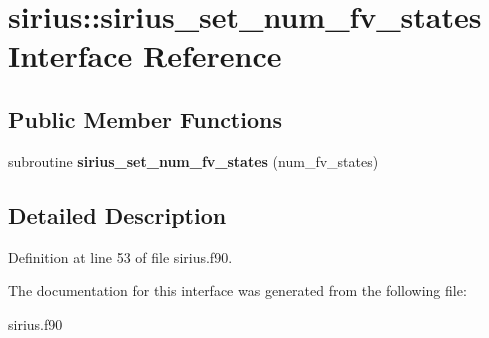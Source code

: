 \hypertarget{interfacesirius_1_1sirius__set__num__fv__states}{}\section{sirius\+:\+:sirius\+\_\+set\+\_\+num\+\_\+fv\+\_\+states Interface Reference}
\label{interfacesirius_1_1sirius__set__num__fv__states}
\subsection*{Public Member Functions}
\begin{DoxyCompactItemize}
\item 
\hypertarget{interfacesirius_1_1sirius__set__num__fv__states_afc4285354cc17c23a5c145122dc29dd7}{}subroutine {\bfseries sirius\+\_\+set\+\_\+num\+\_\+fv\+\_\+states} (num\+\_\+fv\+\_\+states)\label{interfacesirius_1_1sirius__set__num__fv__states_afc4285354cc17c23a5c145122dc29dd7}

\end{DoxyCompactItemize}


\subsection{Detailed Description}


Definition at line 53 of file sirius.\+f90.



The documentation for this interface was generated from the following file\+:\begin{DoxyCompactItemize}
\item 
sirius.\+f90\end{DoxyCompactItemize}
